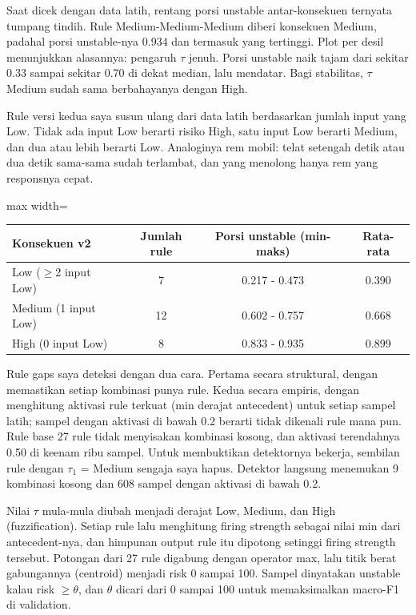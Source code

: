 Saat dicek dengan data latih, rentang porsi unstable antar-konsekuen ternyata tumpang tindih. Rule Medium-Medium-Medium diberi konsekuen Medium, padahal porsi unstable-nya 0.934 dan termasuk yang tertinggi. Plot per desil menunjukkan alasannya: pengaruh $\tau$ jenuh. Porsi unstable naik tajam dari sekitar 0.33 sampai sekitar 0.70 di dekat median, lalu mendatar. Bagi stabilitas, $\tau$ Medium sudah sama berbahayanya dengan High.

Rule versi kedua saya susun ulang dari data latih berdasarkan jumlah input yang Low. Tidak ada input Low berarti risiko High, satu input Low berarti Medium, dan dua atau lebih berarti Low. Analoginya rem mobil: telat setengah detik atau dua detik sama-sama sudah terlambat, dan yang menolong hanya rem yang responsnya cepat.


\begin{adjustbox}{max width=\textwidth}\begin{tabular}{@{}lccc@{}}
\toprule
\textbf{Konsekuen v2} & \textbf{Jumlah rule} & \textbf{Porsi unstable (min-maks)} & \textbf{Rata-rata} \\
\midrule
Low ($\geq$2 input Low) & 7 & 0.217 - 0.473 & 0.390 \\
Medium (1 input Low) & 12 & 0.602 - 0.757 & 0.668 \\
High (0 input Low) & 8 & 0.833 - 0.935 & 0.899 \\
\bottomrule
\end{tabular}\end{adjustbox}

Rule gaps saya deteksi dengan dua cara. Pertama secara struktural, dengan memastikan setiap kombinasi punya rule. Kedua secara empiris, dengan menghitung aktivasi rule terkuat (min derajat antecedent) untuk setiap sampel latih; sampel dengan aktivasi di bawah 0.2 berarti tidak dikenali rule mana pun. Rule base 27 rule tidak menyisakan kombinasi kosong, dan aktivasi terendahnya 0.50 di keenam ribu sampel. Untuk membuktikan detektornya bekerja, sembilan rule dengan $\tau_1$ = Medium sengaja saya hapus. Detektor langsung menemukan 9 kombinasi kosong dan 608 sampel dengan aktivasi di bawah 0.2.

Nilai $\tau$ mula-mula diubah menjadi derajat Low, Medium, dan High (fuzzification). Setiap rule lalu menghitung firing strength sebagai nilai min dari antecedent-nya, dan himpunan output rule itu dipotong setinggi firing strength tersebut. Potongan dari 27 rule digabung dengan operator max, lalu titik berat gabungannya (centroid) menjadi risk 0 sampai 100. Sampel dinyatakan unstable kalau risk $\geq \theta$, dan $\theta$ dicari dari 0 sampai 100 untuk memaksimalkan macro-F1 di validation.

